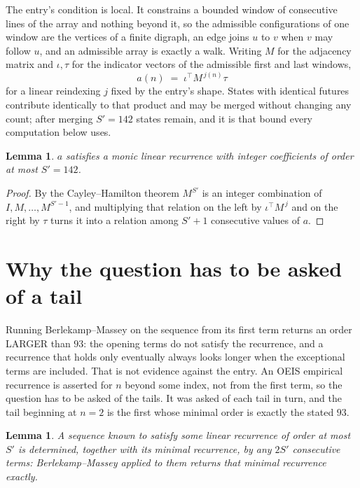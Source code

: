 \documentclass[11pt,a4paper]{article}
\theoremstyle{plain}
\newtheorem{lemma}[theorem]{Lemma}
\theoremstyle{definition}
\begin{document}
The entry's condition is local. It constrains a bounded window of consecutive lines of the
array and nothing beyond it, so the admissible configurations of one window are the vertices of
a finite digraph, an edge joins $u$ to $v$ when $v$ may follow $u$, and an admissible array is
exactly a walk. Writing $M$ for the adjacency matrix and $\iota,\tau$ for the indicator vectors
of the admissible first and last windows,
\[
a(n)\;=\;\iota^{\!\top}M^{\,j(n)}\tau
\]
for a linear reindexing $j$ fixed by the entry's shape. States with identical futures
contribute identically to that product and may be merged without changing any count; after
merging $S'=142$ states remain, and it is that bound every computation below uses.

\begin{lemma}\label{lem:cf}
$a$ satisfies a monic linear recurrence with integer coefficients of order at most $S'=142$.
\end{lemma}

\begin{proof}
By the Cayley--Hamilton theorem $M^{S'}$ is an integer combination of $I,M,\dots,M^{S'-1}$,
and multiplying that relation on the left by $\iota^{\!\top}M^{\,j}$ and on the right by
$\tau$ turns it into a relation among $S'+1$ consecutive values of $a$.
\end{proof}

\section{Why the question has to be asked of a tail}

Running Berlekamp--Massey on the sequence from its first term returns an order LARGER than $93$: the opening terms do not satisfy the recurrence, and a recurrence that holds only eventually always looks longer when the exceptional terms are included. That is not evidence against the entry. An OEIS empirical recurrence is asserted for $n$ beyond some index, not from the first term, so the question has to be asked of the tails. It was asked of each tail in turn, and the tail beginning at $n=2$ is the first whose minimal order is exactly the stated $93$.

\begin{lemma}\label{lem:bm}
A sequence known to satisfy some linear recurrence of order at most $S'$ is determined,
together with its minimal recurrence, by any $2S'$ consecutive terms: Berlekamp--Massey applied
to them returns that minimal recurrence exactly.
\end{lemma}
\end{document}
